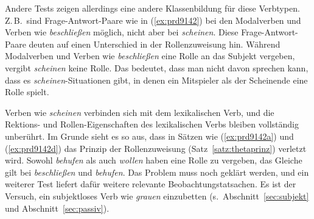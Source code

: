 Andere Tests zeigen allerdings eine andere Klassenbildung für diese Verbtypen.
Z.\,B.\ sind Frage-Antwort-Paare wie in (\ref{ex:prd9142}) bei den Modalverben und Verben wie \textit{beschließen} möglich, nicht aber bei \textit{scheinen}.
Diese Frage-Antwort-Paare deuten auf einen Unterschied in der Rollenzuweisung hin.
Während Modalverben und Verben wie \textit{beschließen} eine Rolle an das Subjekt vergeben, vergibt \textit{scheinen} keine Rolle.
Das bedeutet, dass man nicht davon sprechen kann, dass es \textit{scheinen}-Situationen gibt, in denen ein Mitspieler als der Scheinende eine Rolle spielt.

\begin{exe}
  \ex\label{ex:prd9142} 
  \begin{xlist}
  \end{xlist}
\end{exe}

Verben wie \textit{scheinen} verbinden sich mit dem lexikalischen Verb, und die Rek\-tions- und Rollen-Eigenschaften des lexikalischen Verbs bleiben vollständig unberührt.
Im Grunde sieht es so aus, dass in Sätzen wie (\ref{ex:prd9142a}) und (\ref{ex:prd9142d}) das Prinzip der Rollenzuweisung (Satz~\ref{satz:thetaprinz}) verletzt wird.
Sowohl \textit{behufen} als auch \textit{wollen} haben eine Rolle zu vergeben, das Gleiche gilt bei \textit{beschließen} und \textit{behufen}.
Das Problem muss noch geklärt werden, und ein weiterer Test liefert dafür weitere relevante Beobachtungstatsachen.
Es ist der Versuch, ein subjektloses Verb wie \textit{grauen} einzubetten (s.\ Abschnitt~\ref{sec:subjekt} und Abschnitt~\ref{sec:passiv}).

\begin{exe}
  \ex\label{ex:prd9143}
  \begin{xlist}
  \end{xlist}
\end{exe}

